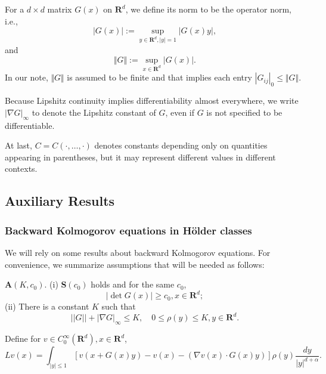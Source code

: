 \documentclass[11pt]{amsart}
\theoremstyle{plain}
\numberwithin{equation}{section}
\begin{document}
For a $d\times d$ matrix $G\left( x\right) $ on $\mathbf{R}^{d}$, we define
its norm to be the operator norm, i.e., 
\begin{equation*}
\left\vert G\left( x\right) \right\vert :=\sup_{y\in \mathbf{R}^{d},\left\vert y\right\vert =1}\left\vert G\left( x\right) y\right\vert ,
\end{equation*}and 
\begin{equation*}
\Vert G\Vert :=\sup_{x\in \mathbf{R}^{d}}\left\vert G\left( x\right)
\right\vert .
\end{equation*}In our note, $\Vert G\Vert $ is assumed to be finite and that implies each
entry $\left\vert G_{ij}\right\vert _{0}\leq \Vert G\Vert $.

Because Lipshitz continuity implies differentiability almost everywhere, we
write $\left\vert \nabla G\right\vert _{\infty }$ to denote the Lipshitz
constant of $G$, even if $G$ is not specified to be differentiable.

At last, $C=C\left( \cdot ,\ldots ,\cdot \right) $ denotes constants
depending only on quantities appearing in parentheses, but it may represent
different values in different contexts.

\subsection{Auxiliary Results}

\subsubsection{Backward Kolmogorov equations in H\"{o}lder classes}

We will rely on some results about backward Kolmogorov equations. For
convenience, we summarize assumptions that will be needed as follows:

\textbf{A}$(K,c_{0})$. (i) \textbf{S}$\left( c_{0}\right) $ holds and for
the same $c_{0}$, 
\begin{equation*}
\left\vert \det G\left( x\right) \right\vert \geq c_{0},x\in \mathbf{R}^{d};
\end{equation*}(ii) There is a constant $K$ such that 
\begin{equation*}
\left\vert \left\vert G\right\vert \right\vert +\left\vert \nabla
G\right\vert _{\infty }\leq K,\quad 0\leq \rho \left( y\right) \leq K,y\in 
\mathbf{R}^{d}.
\end{equation*}

Define for $v\in C_{0}^{\infty }\left( \mathbf{R}^{d}\right), x\in \mathbf{R}^{d}$, 
\begin{equation}
Lv\left( x\right) =\int_{\left\vert y\right\vert \leq 1}\left[ v\left(
x+G\left( x\right) y\right) -v\left( x\right) -\left( \nabla v\left(
x\right) \cdot G\left( x\right) y\right) \right] \rho \left( y\right) \frac{dy}{|y|^{d+\alpha }}.  \label{e0}
\end{equation}
\end{document}
